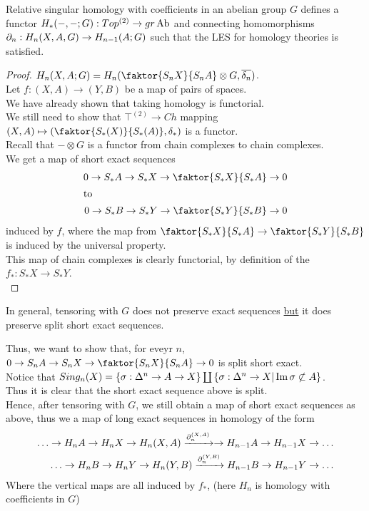 \documentclass[../main.tex]{subfiles}
\begin{document}
\begin{propo}
Relative singular homology with coefficients in an abelian group $G$ defines a functor $H_\ast( -,-;G) :Top^{( 2) }\to gr\operatorname{Ab}$ and connecting homomorphisms  $\partial_n:H_n( X,A,G) \to H_{n-1} ( A;G) $ such that the LES for homology theories is satisfied.
\end{propo}
\begin{proof}
$H_n( X,A;G) = H_n ( \faktor{S_n X}{S_n A}\otimes G, \overline{\delta_n}) $.\\
Let $f:( X,A) \to ( Y,B) $ be a map of pairs of spaces.\\
We have already shown that taking homology is functorial.\\
We still need to show that $\top^{( 2) }\to Ch$ mapping $( X,A) \mapsto ( \faktor{S_\ast ( X) }{S_\ast ( A) },\delta_\ast) $ is a functor.\\
Recall that $- \otimes G$ is a functor from chain complexes to chain complexes.\\
We get a map of short exact sequences
\begin{align*}
0 \to S_\ast A \to S_\ast X \to \faktor{S_\ast X}{S_\ast A}\to 0\\
\intertext{to}
0 \to S_\ast B \to S_\ast Y \to \faktor{S_\ast Y}{S_\ast B}\to 0
\end{align*}
induced by $f$, where the map from $ \faktor{S_\ast X}{S_\ast A}\to \faktor{S_\ast Y}{S_\ast B}$ is induced by the universal property.\\
This map of chain complexes is clearly functorial, by definition of the $f_\ast : S_\ast X\to S_\ast Y$.\\
\end{proof}
\begin{rmq}
	In general, tensoring with $G$ does not preserve exact sequences \underline{but} it does preserve split short exact sequences.
\end{rmq}
Thus, we want to show that, for eveyr $n$, $0 \to S_n A \to S_n X\to \faktor{S_n X}{S_n A}\to 0$ is split short exact.\\
Notice that $Sing_n ( X) = \left\{  \sigma: \Delta^{n} \to A \to X\right\}\coprod \left\{ \sigma: \Delta^{n}\to X| \operatorname{Im} \sigma \not \subset A \right\}  $.\\
Thus it is clear that the short exact sequence above is split.\\
Hence, after tensoring with $G$, we still obtain a map of short exact sequences as above, thus we a map of  long exact sequences in homology of the form
\begin{align*}
\ldots \to H_n A \to H_n X \to H_n ( X,A) \xrightarrow{\partial_n^{( X,A) }} \to H_{n-1} A \to H_{n-1} X\to \ldots\\
\ldots \to H_n B \to H_n Y \to H_n ( Y,B) \xrightarrow{\partial_n^{( Y,B) }}  H_{n-1} B \to H_{n-1} Y\to \ldots\\
\end{align*}
Where the vertical maps are all induced by $f_\ast$, (here $H_n$ is homology with coefficients in $G$) \\
\end{document}
